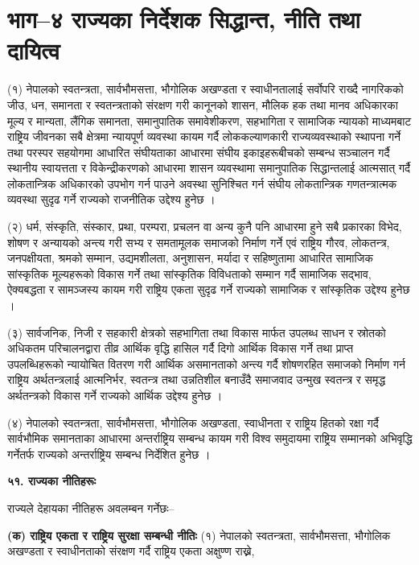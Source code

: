 \section{भाग–४ राज्यका निर्देशक सिद्धान्त, नीति तथा दायित्व}

(१) नेपालको स्वतन्त्रता, सार्वभौमसत्ता, भौगोलिक अखण्डता र स्वाधीनतालाई सर्वोपरि राख्दै नागरिकको जीउ, धन, समानता र स्वतन्त्रताको संरक्षण गरी कानूनको शासन, मौलिक हक तथा मानव अधिकारका मूल्य र मान्यता, लैंगिक समानता, समानुपातिक समावेशीकरण, सहभागिता र सामाजिक न्यायको माध्यमबाट राष्ट्रिय जीवनका सबै क्षेत्रमा न्यायपूर्ण व्यवस्था कायम गर्दै लोककल्याणकारी राज्यव्यवस्थाको स्थापना गर्ने तथा परस्पर सहयोगमा आधारित संघीयताका आधारमा संघीय इकाइहरूबीचको सम्बन्ध सञ्चालन गर्दै स्थानीय स्वायत्तता र विकेन्द्रीकरणको आधारमा शासन व्यवस्थामा समानुपातिक सिद्धान्तलाई आत्मसात् गर्दै लोकतान्त्रिक अधिकारको उपभोग गर्न पाउने अवस्था सुनिश्चित गर्न संघीय लोकतान्त्रिक गणतन्त्रात्मक व्यवस्था सुदृढ गर्ने राज्यको राजनीतिक उद्देश्य हुनेछ ।

(२) धर्म, संस्कृति, संस्कार, प्रथा, परम्परा, प्रचलन वा अन्य कुनै पनि आधारमा हुने सबै प्रकारका विभेद, शोषण र अन्यायको अन्त्य गरी सभ्य र समतामूलक समाजको निर्माण गर्ने एवं राष्ट्रिय गौरव, लोकतन्त्र, जनपक्षीयता, श्रमको सम्मान, उद्यमशीलता, अनुशासन, मर्यादा र सहिष्णुतामा आधारित सामाजिक सांस्कृतिक मूल्यहरूको विकास गर्ने तथा सांस्कृतिक विविधताको सम्मान गर्दै सामाजिक सद्भाव, ऐक्यबद्धता र सामञ्जस्य कायम गरी राष्ट्रिय एकता सुदृढ गर्ने राज्यको सामाजिक र सांस्कृतिक उद्देश्य हुनेछ ।

(३) सार्वजनिक, निजी र सहकारी क्षेत्रको सहभागिता तथा विकास मार्फत उपलब्ध साधन र स्रोतको अधिकतम परिचालनद्वारा तीव्र आर्थिक वृद्धि हासिल गर्दै दिगो आर्थिक विकास गर्ने तथा प्राप्त उपलब्धिहरूको न्यायोचित वितरण गरी आर्थिक असमानताको अन्त्य गर्दै शोषणरहित समाजको निर्माण गर्न राष्ट्रिय अर्थतन्त्रलाई आत्मनिर्भर, स्वतन्त्र तथा उन्नतिशील बनाउँदै समाजवाद उन्मुख स्वतन्त्र र समृद्ध अर्थतन्त्रको विकास गर्ने राज्यको आर्थिक उद्देश्य हुनेछ ।

(४) नेपालको स्वतन्त्रता, सार्वभौमसत्ता, भौगोलिक अखण्डता, स्वाधीनता र राष्ट्रिय हितको रक्षा गर्दै सार्वभौमिक समानताका आधारमा अन्तर्राष्ट्रिय सम्बन्ध कायम गरी विश्व समुदायमा राष्ट्रिय सम्मानको अभिवृद्धि गर्नेतर्फ राज्यको अन्तर्राष्ट्रिय सम्बन्ध निर्देशित हुनेछ ।

\textbf{५१. राज्यका नीतिहरूः}

राज्यले देहायका नीतिहरू अवलम्बन गर्नेछः–

\textbf{(क) राष्ट्रिय एकता र राष्ट्रिय सुरक्षा सम्बन्धी नीतिः}
(१) नेपालको स्वतन्त्रता, सार्वभौमसत्ता, भौगोलिक अखण्डता र स्वाधीनताको संरक्षण गर्दै राष्ट्रिय एकता अक्षुण्ण राख्ने,

